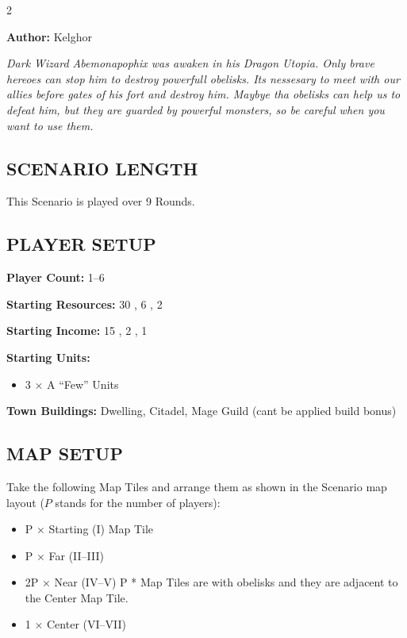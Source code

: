 
\begin{multicols}{2}

\textbf{Author:} Kelghor

\textit{Dark Wizard Abemonapophix was awaken in his Dragon Utopia. Only brave hereoes can stop him to destroy powerfull obelisks. Its nessesary to meet with our allies before gates of his fort and destroy him. Maybye tha obelisks can help us to defeat him, but they are guarded by powerful monsters, so be careful when you want to use them.}

\subsection*{\MakeUppercase{Scenario Length}}

This Scenario is played over 9 Rounds.

\subsection*{\MakeUppercase{Player Setup}}

\textbf{Player Count:} 1--6

\textbf{Starting Resources:} 30 , 6 , 2 

\textbf{Starting Income:} 15 , 2 , 1 

\textbf{Starting Units:}
\begin{itemize}
  \item 3 × A ``Few''  Units
\end{itemize}

\textbf{Town Buildings:}  Dwelling, Citadel, Mage Guild (cant be applied build bonus)

\subsection*{\MakeUppercase{Map Setup}}

Take the following Map Tiles and arrange them as shown in the Scenario map layout ($P$ stands for the number of players):

\begin{itemize}
  \item P × Starting (I) Map Tile
  \item P × Far (II--III)
  \item 2P × Near (IV--V) P * Map Tiles are with obelisks and they are adjacent to the Center Map Tile.
  \item 1 × Center (VI--VII)
\end{itemize}


\end{multicols}
